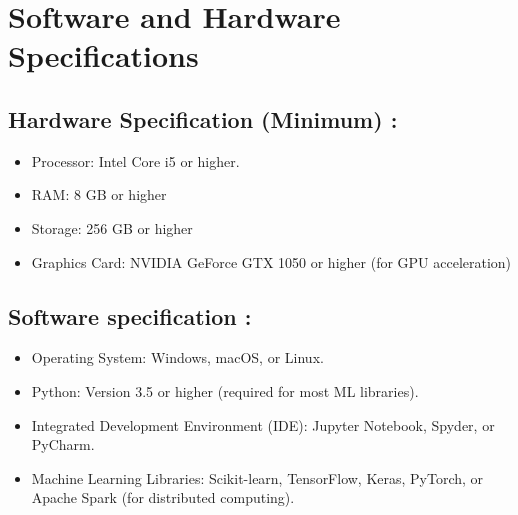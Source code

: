 \chapter{Software and Hardware Specifications}
\section{Hardware Specification (Minimum) :}
\justify
\quad
\begin{itemize}
    \item Processor: Intel Core i5 or higher.
    \item RAM: 8 GB or higher
    \item Storage: 256 GB or higher
    \item Graphics Card: NVIDIA GeForce GTX 1050 or higher (for GPU acceleration)
\end{itemize}

\section{Software specification :}
\justify
\quad
\begin{itemize}
    \item Operating System: Windows, macOS, or Linux.
    \item Python: Version 3.5 or higher (required for most ML libraries).
    \item Integrated Development Environment (IDE): Jupyter Notebook, Spyder, or PyCharm.
    \item Machine Learning Libraries: Scikit-learn, TensorFlow, Keras, PyTorch, or Apache Spark (for distributed computing).
\end{itemize}

\newpage